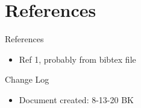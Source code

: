 \documentclass[handout]{beamer}
\begin{document}

\section{References}
\begin{frame}{References}
\begin{itemize}
  \item Ref 1, probably from bibtex file
\end{itemize}
\end{frame}

\begin{frame}{Change Log}
\begin{itemize}
  \item Document created: 8-13-20 BK
\end{itemize}
\end{frame}
\end{document}

